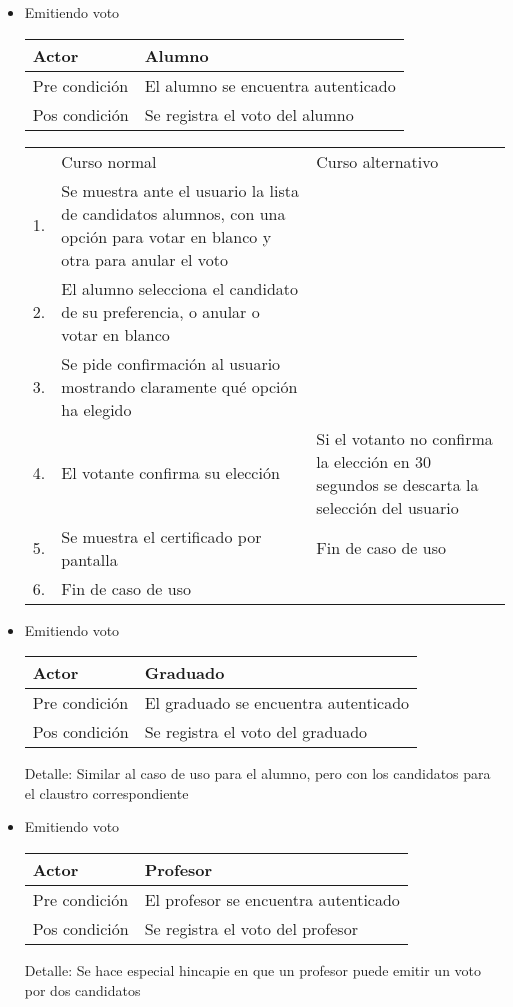 \begin{itemize}
\bigskip
\item Emitiendo voto
\bigskip
\begin{center}
\begin{tabular}{ll}
Actor & Alumno \\
\hline
Pre condición & El alumno se encuentra autenticado \\
\hline
Pos condición & Se registra el voto del alumno\\
\hline
\end{tabular}
\medskip
\begin{tabular}{c p{4cm}|p{4cm}}
 & Curso normal & Curso alternativo \\
 1. & Se muestra ante el usuario la lista de candidatos alumnos, con una opción para votar en blanco y otra para anular el voto &  \\
 2. & El alumno selecciona el candidato de su preferencia, o anular o votar en blanco & \\
 3. & Se pide confirmación al usuario mostrando claramente qué opción ha elegido & \\
 4. & El votante confirma su elección & Si el votanto no confirma la elección en 30 segundos se descarta la selección del usuario \\
 5. & Se muestra el certificado por pantalla & Fin de caso de uso \\
 6. & Fin de caso de uso & \\ 
\end{tabular}
\end{center}

\bigskip
\item Emitiendo voto
\bigskip
\begin{center}
\begin{tabular}{ll}
Actor & Graduado \\
\hline
Pre condición & El graduado se encuentra autenticado \\
\hline
Pos condición & Se registra el voto del graduado\\
\hline
\end{tabular}
\medskip
Detalle: Similar al caso de uso para el alumno, pero con los candidatos para el claustro correspondiente
\end{center}

\bigskip
\item Emitiendo voto
\bigskip
\begin{center}
\begin{tabular}{ll}
Actor & Profesor \\
\hline
Pre condición & El profesor se encuentra autenticado \\
\hline
Pos condición & Se registra el voto del profesor\\
\hline
\end{tabular}
\medskip
Detalle: Se hace especial hincapie en que un profesor puede emitir un voto por dos candidatos
\end{center}


\end{itemize}
